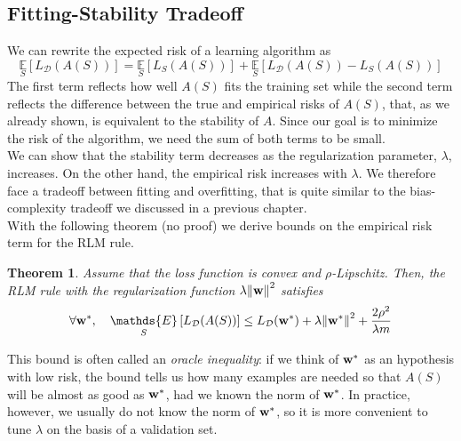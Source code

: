 \documentclass[12pt]{report}
\theoremstyle{plain}
\newtheorem{theorem}{Theorem}[chapter]
\newcommand\mcl[1]{\mathcal{#1}}
\begin{document}
\begin{flushleft}
\section{Fitting-Stability Tradeoff}
We can rewrite the expected risk of a learning algorithm as
\[ \underset{S}{\mathds{E}}\left[L_\mcl{D}(A(S))\right] = \underset{S}{\mathds{E}}\left[L_S(A(S))\right] + \underset{S}{\mathds{E}}\left[L_\mcl{D}(A(S))-L_S(A(S))\right] \]
The first term reflects how well $A(S)$ fits the training set while the second term reflects the difference between the true and empirical risks of $A(S)$, that, as we already shown, is equivalent to the stability of $A$. Since our goal is to minimize the risk of the algorithm, we need the sum of both terms to be small.\\
We can show that the stability term decreases as the regularization parameter, $\lambda$, increases. On the other hand, the empirical risk increases with $\lambda$. We therefore face a tradeoff between fitting and overfitting, that is quite similar to the bias-complexity tradeoff we discussed in a previous chapter.\\
With the following theorem (no proof) we derive bounds on the empirical risk term for the RLM rule.
\begin{theorem}
	Assume that the loss function is convex and $\rho$-Lipschitz. Then, the RLM rule with the regularization function $\lambda\norm{\vb{w}}^2$ satisfies
	\[ \forall\vb{w}^*,\quad \underset{S}{\mathds{E}}\left[L_\mcl{D}(A(S))\right]\leq L_\mcl{D}(\vb{w}^*)+\lambda\norm{\vb{w}^*}^2+\frac{2\rho^2}{\lambda m} \]
\end{theorem}
This bound is often called an \textit{oracle inequality}: if we think of $\vb{w}^*$ as an hypothesis with low risk, the bound tells us how many examples are needed so that $A(S)$ will be almost as good as $\vb{w}^*$, had we known the norm of $\vb{w}^*$. In practice, however, we usually do not know the norm of $\vb{w}^*$, so it is more convenient to tune $\lambda$ on the basis of a validation set.



\end{flushleft}
\end{document}
